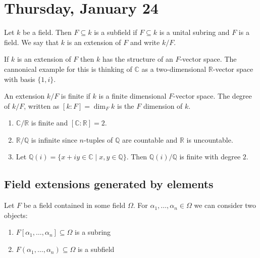 
\section{Thursday, January 24}

\begin{definition}[Extension]
Let $k$ be a field. Then $F \subseteq k$ is a subfield if $F \subseteq k$ is a unital subring and $F$ is a field.
We say that $k$ is an extension of $F$ and write $k/F$.
\end{definition}

\begin{example}
If $k$ is an extension of $F$ then $k$ has the structure of an $F$-vector space. The cannonical example for this is thinking of $\mathbb{C}$ as a two-dimensional $\mathbb{R}$-vector space with basis $\{1, i\}$.
\end{example}

\begin{definition}
An extension $k/F$ is finite if $k$ is a finite dimensional $F$-vector space. The degree of $k/F$, written as $[k : F] = \dim_Fk$ is the $F$ dimension of $k$.
\end{definition}

\begin{example}
\begin{enumerate}
\item $\mathbb{C}/\mathbb{R}$ is finite and $[\mathbb{C} : \mathbb{R}] = 2$.
\item $\mathbb{R}/\mathbb{Q}$ is infinite since $n$-tuples of $\mathbb{Q}$ are countable and $\mathbb{R}$ is uncountable.
\item Let $\mathbb{Q}(i) = \{x + iy \in \mathbb{C} \mid x,y \in \mathbb{Q}\}$. Then $\mathbb{Q}(i)/\mathbb{Q}$ is finite with degree $2$.
\end{enumerate}
\end{example}

\subsection{Field extensions generated by elements}

Let $F$ be a field contained in some field $\Omega$. For $\alpha_1, \dotsc, \alpha_n \in \Omega$ we can consider two objects:
\begin{enumerate}
\item $F[\alpha_1, \dotsc, \alpha_n] \subseteq \Omega$ is a subring
\item $F(\alpha_1, \dotsc, \alpha_n) \subseteq \Omega$ is a subfield
\end{enumerate}

